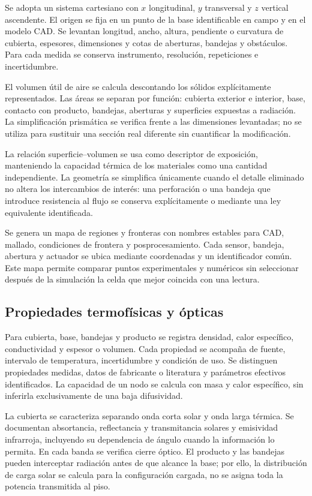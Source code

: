 Se adopta un sistema cartesiano con $x$ longitudinal, $y$ transversal y $z$ vertical ascendente. El origen se fija en un punto de la base identificable en campo y en el modelo CAD. Se levantan longitud, ancho, altura, pendiente o curvatura de cubierta, espesores, dimensiones y cotas de aberturas, bandejas y obstáculos. Para cada medida se conserva instrumento, resolución, repeticiones e incertidumbre.

El volumen útil de aire se calcula descontando los sólidos explícitamente representados. Las áreas se separan por función: cubierta exterior e interior, base, contacto con producto, bandejas, aberturas y superficies expuestas a radiación. La simplificación prismática se verifica frente a las dimensiones levantadas; no se utiliza para sustituir una sección real diferente sin cuantificar la modificación.

La relación superficie--volumen se usa como descriptor de exposición, manteniendo la capacidad térmica de los materiales como una cantidad independiente. La geometría se simplifica únicamente cuando el detalle eliminado no altera los intercambios de interés: una perforación o una bandeja que introduce resistencia al flujo se conserva explícitamente o mediante una ley equivalente identificada.

Se genera un mapa de regiones y fronteras con nombres estables para CAD, mallado, condiciones de frontera y posprocesamiento. Cada sensor, bandeja, abertura y actuador se ubica mediante coordenadas y un identificador común. Este mapa permite comparar puntos experimentales y numéricos sin seleccionar después de la simulación la celda que mejor coincida con una lectura.

\subsection{Propiedades termofísicas y ópticas}

Para cubierta, base, bandejas y producto se registra densidad, calor específico, conductividad y espesor o volumen. Cada propiedad se acompaña de fuente, intervalo de temperatura, incertidumbre y condición de uso. Se distinguen propiedades medidas, datos de fabricante o literatura y parámetros efectivos identificados. La capacidad de un nodo se calcula con masa y calor específico, sin inferirla exclusivamente de una baja difusividad.

La cubierta se caracteriza separando onda corta solar y onda larga térmica. Se documentan absortancia, reflectancia y transmitancia solares y emisividad infrarroja, incluyendo su dependencia de ángulo cuando la información lo permita. En cada banda se verifica cierre óptico. El producto y las bandejas pueden interceptar radiación antes de que alcance la base; por ello, la distribución de carga solar se calcula para la configuración cargada, no se asigna toda la potencia transmitida al piso.

